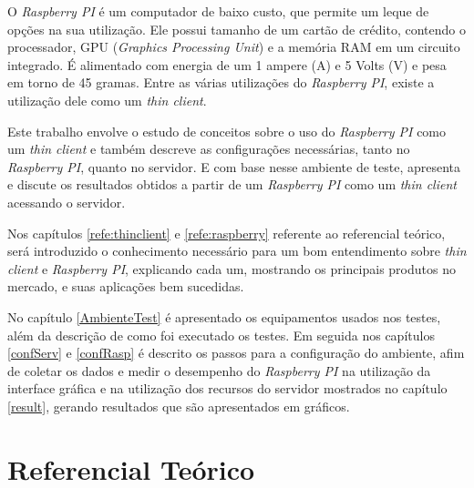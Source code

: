 \documentclass[
	12pt,				%
	openright,			%
	twoside,			%
	a4paper,			%
	chapter=TITLE,		%
	english,			%
	brazil				%
	]{abntex2}
\begin{document}
O \textit{Raspberry PI} é um computador de baixo custo, que permite um leque de opções na sua utilização. Ele possui tamanho de um cartão de crédito, contendo o processador, GPU (\textit{Graphics Processing Unit}) e a memória RAM em um circuito integrado. É alimentado com energia de um 1 ampere (A) e 5 Volts (V) e pesa em torno de 45 gramas. Entre as várias utilizações do \textit{Raspberry PI}, existe a utilização dele como um  \textit{thin client}.

Este trabalho envolve o estudo de conceitos sobre o uso do \textit{Raspberry PI} como um \textit{thin client} e também descreve as configurações necessárias, tanto no \textit{Raspberry PI}, quanto no servidor. E com base nesse ambiente de teste, apresenta e discute os resultados obtidos a partir de um \textit{Raspberry PI} como um \textit{thin client} acessando o servidor.

Nos capítulos \ref{refe:thinclient} e \ref{refe:raspberry} referente ao referencial teórico, será introduzido o conhecimento necessário para um bom entendimento sobre  \textit{thin client} e \textit{Raspberry PI}, explicando cada um, mostrando os principais produtos no mercado, e suas aplicações bem sucedidas. 

No capítulo \ref{AmbienteTest} é apresentado os equipamentos usados nos testes, além da descrição de como foi executado os testes. Em seguida nos capítulos \ref{confServ} e \ref{confRasp} é descrito os passos para a configuração do ambiente, afim de coletar os dados e medir o desempenho do \textit{Raspberry PI} na utilização da interface gráfica e na utilização dos recursos do servidor mostrados no capítulo \ref{result}, gerando resultados que são apresentados em gráficos.






\part{Referencial Teórico}
\end{document}

